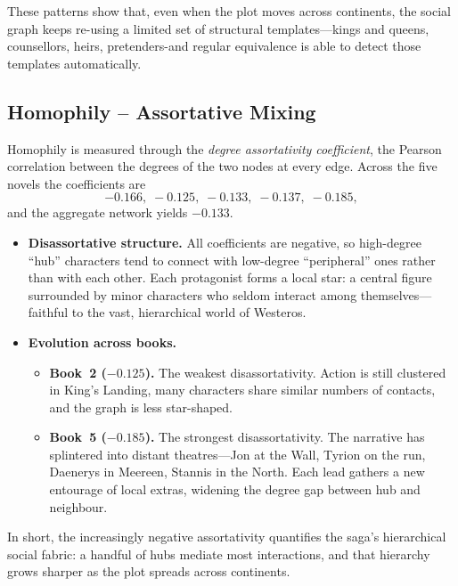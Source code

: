 \documentclass[12pt, a4paper]{article}
\begin{document}
These patterns show that, even when the plot moves across continents, the social graph keeps re-using a limited set of structural templates—kings and queens, counsellors, heirs, pretenders-and regular equivalence is able to detect those templates automatically.

\subsection*{Homophily – Assortative Mixing}

Homophily is measured through the \emph{degree assortativity coefficient}, the Pearson correlation between the degrees of the two nodes at every edge.  
Across the five novels the coefficients are
\[
-0.166,\;-0.125,\;-0.133,\;-0.137,\;-0.185,
\]
and the aggregate network yields \(-0.133\).

\begin{itemize}
  \item \textbf{Disassortative structure.}  
        All coefficients are negative, so high-degree “hub” characters tend to connect with low-degree “peripheral” ones rather than with each other.  
        Each protagonist forms a local star: a central figure surrounded by minor characters who seldom interact among themselves—faithful to the vast, hierarchical world of Westeros.

  \item \textbf{Evolution across books.}
        \begin{itemize}
          \item \textbf{Book~2 (\(-0.125\)).}  
                The weakest disassortativity. Action is still clustered in King’s Landing, many characters share similar numbers of contacts, and the graph is less star-shaped.

          \item \textbf{Book~5 (\(-0.185\)).}  
                The strongest disassortativity. The narrative has splintered into distant theatres—Jon at the Wall, Tyrion on the run, Daenerys in Meereen, Stannis in the North.  
                Each lead gathers a new entourage of local extras, widening the degree gap between hub and neighbour.
        \end{itemize}
\end{itemize}

\medskip
In short, the increasingly negative assortativity quantifies the saga’s hierarchical social fabric: a handful of hubs mediate most interactions, and that hierarchy grows sharper as the plot spreads across continents.
\end{document}
